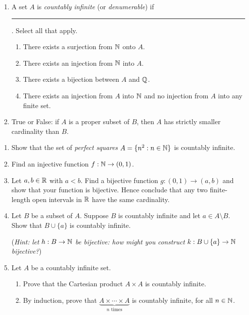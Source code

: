 \pagestyle{empty}


\begin{enumerate}
	\item A set $A$ is \emph{countably infinite} (or \emph{denumerable}) if \rule{3cm}{0.15mm}. Select all that apply.
  \begin{enumerate}
    \item There exists a surjection from $\mathbb{N}$ onto $A$.
    \item There exists an injection from $\mathbb{N}$ into $A$.
    \item There exists a bijection between $A$ and $\mathbb{Q}$.
    \item There exists an injection from $A$ into $\mathbb{N}$ and no injection from $A$ into any finite set.
  \end{enumerate}
    
  \item True or False: if $A$ is a proper subset of $B$, then $A$ has strictly smaller cardinality than $B$.
\end{enumerate}



\begin{enumerate}
	\item Show that the set of \emph{perfect squares} $A=\{n^2:n\in\mathbb{N}\}$ is countably infinite.
  
	\item Find an injective function $f:\mathbb{N}\to (0,1)$.

	\item Let $a,b\in\mathbb{R}$ with $a<b$. Find a bijective function $g:(0,1)\to (a,b)$ and show that your function is bijective. Hence conclude that any two finite-length open intervals in $\mathbb{R}$ have the same cardinality.
	
	\item Let $B$ be a subset of $A$. Suppose $B$ is countably infinite and let $a\in A\setminus B$. Show that $B \cup\{a\}$ is countably infinite.\par
	(\emph{Hint: let $h:B\to\mathbb{N}$ be bijective: how might you construct $k:B\cup\{a\}\to\mathbb{N}$ bijective?})
	
	\item Let $A$ be a countably infinite set.
	\begin{enumerate}
	  \item Prove that the Cartesian product $A\times A$ is countably infinite.
	  \item By induction, prove that $\underbrace{A \times \cdots \times A}_{n \text{ times}}$ is countably infinite, for all $n\in\mathbb{N}$.
	\end{enumerate}
\end{enumerate}

